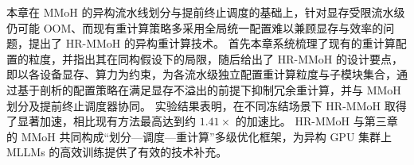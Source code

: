 本章在 MMoH 的异构流水线划分与提前终止调度的基础上，针对显存受限流水级仍可能 OOM、而现有重计算策略多采用全局统一配置难以兼顾显存与效率的问题，提出了 HR-MMoH 的异构重计算技术。
首先本章系统梳理了现有的重计算配置的粒度，并指出其在同构假设下的局限，随后给出了 HR-MMoH 的设计要点，即以各设备显存、算力为约束，为各流水级独立配置重计算粒度与子模块集合，通过基于剖析的配置策略在满足显存不溢出的前提下抑制冗余重计算，并与 MMoH 划分及提前终止调度器协同。
实验结果表明，在不同冻结场景下 HR-MMoH 取得了显著加速，相比现有方法最高达到约 $1.41\times$ 的加速比。
HR-MMoH 与第三章的 MMoH 共同构成“划分—调度—重计算”多级优化框架，为异构 GPU 集群上 MLLMs 的高效训练提供了有效的技术补充。


